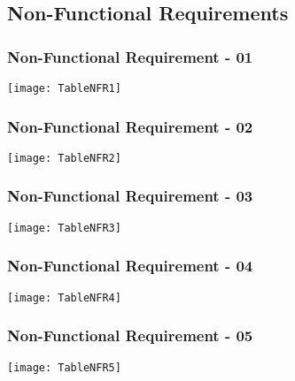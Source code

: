 \begin{figure}[ht]
\subsection{Non-Functional Requirements} 

\subsubsection{Non-Functional Requirement - 01}
\centering
\texttt{[image: TableNFR1]}
\end{figure}

\begin{figure}[ht]
\subsubsection{Non-Functional Requirement - 02}
\centering
\texttt{[image: TableNFR2]}
\end{figure}

\begin{figure}[ht]
\subsubsection{Non-Functional Requirement - 03}
\centering
\texttt{[image: TableNFR3]}
\end{figure}

\begin{figure}[ht]
\subsubsection{Non-Functional Requirement - 04}
\centering
\texttt{[image: TableNFR4]}
\end{figure}

\begin{figure}[ht]
\subsubsection{Non-Functional Requirement - 05}
\centering
\texttt{[image: TableNFR5]}
\end{figure}

